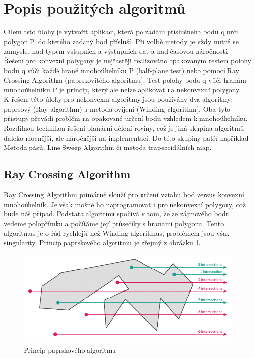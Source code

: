 \documentclass[a4paper,11pt,twoside]{article}
\begin{document}

\section{Popis použitých algoritmů}
\noindent
\large
Cílem této úlohy je vytvořit aplikaci, která po zadání příslušného bodu q určí polygon P, do kterého zadaný bod přísluší. Při volbě metody je vždy nutné se zamyslet nad typem vstupních a výstupních dat a nad časovou náročností. \\
\indent Řešení pro konvexní polygony je nejčastěji realizováno opakovaným testem polohy bodu q vůči každé hraně mnohoúhelníku P (half-plane test) nebo pomocí Ray Crossing Algorithm (paprskovitého algoritmu). Test polohy bodu q vůči hranám mnohoúhelníku P je princip, který ale nelze aplikovat na nekonvexní polygony. \\
\indent K řešení této úlohy pro nekonvexní algoritmy jsou používány dva algoritmy: paprsový (Ray algorithm) a metoda ovíjení (Winding algorithm). Oba tyto přístupy převádí problém na opakované určení bodu vzhledem k mnohoúhelníku. Rozdílnou technikou řešení planární dělení roviny, což je jiná skupina algoritmů daleko mocnější, ale náročnější na implementaci. Do této skupiny patří například Metoda pásů, Line Sweep Algorithm či metoda trapezoidálních map.

\subsection{Ray Crossing Algorithm}
\large
\noindent Ray Crossing Algorithm primárně slouží pro určení vztahu bod versus konvexní mnohoúhelník.  Je však možné ho naprogramovat i pro nekonvexní polygony, což bude náš případ. Podstata algoritmu spočívá v tom, že ze zájmového bodu vedeme polopřímku a počítáme její průsečíky s hranami polygonu. Tento algoritmus je o řád rychlejší než Winding algoritmus, problémem jsou však singularity. Princip paprskového algoritmu je zřejmý z obrázku \ref{fig:ray}.\\

\vspace{0.2cm}
\begin{figure}[hbt!] 
\begin{center}
\includegraphics[width=15cm]{pictures/ray.png} 
\caption[Princip paprskového algoritmu]{Princip paprskového algoritmu \cite{ray}}
\label{fig:ray}
\end{center}
\end{figure}
\vspace{-0.4cm}
\end{document}
